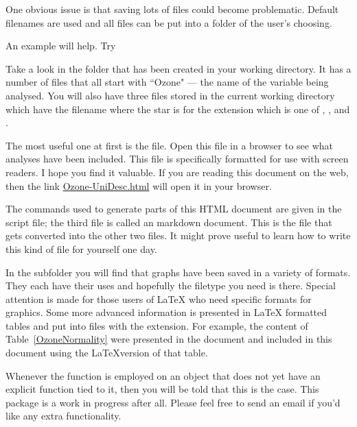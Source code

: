 One obvious issue is that saving lots of files could become problematic. Default filenames are used and all files can be put into a folder of the user's choosing. 
 
An example will help. Try 
\begin{Schunk}
\end{Schunk}
Take a look in the  folder that has been created in your working directory. It has a number of files that all start with ``Ozone" --- the name of the variable being analysed.  You will also have three files stored in the current working directory which have the filename  where the star is for the extension which is one of , , and . 
 
The most useful one at first is the  file. Open this file in a browser to see what analyses have been included. This file is specifically formatted for use with screen readers. I hope you find it valuable. If you are reading this document on the web, then the link \url{Ozone-UniDesc.html} will open it in your browser.  
 
The commands used to generate parts of this HTML document are given in the \R{} script file; the third file is called an \R{} markdown document. This is the file that gets converted into the other two files. It might prove useful to learn how to write this kind of file for yourself one day. 
 
In the  subfolder you will find that graphs have been saved in a variety of formats. They each have their uses and hopefully the filetype you need is there. Special attention is made for those users of \LaTeX{} who need specific formats for graphics. Some more advanced information is presented in \LaTeX{} formatted tables and put into files with the  extension. For example, the content of Table~\ref{OzoneNormality} were presented in the  document and included in this document using the \LaTeX{}version of that table. 
 
 
 
Whenever the  function is employed on an object that does not yet have an explicit function tied to it, then you will be told that this is the case. This package is a work in progress after all. Please feel free to send an email if you'd like any extra functionality. 
 
